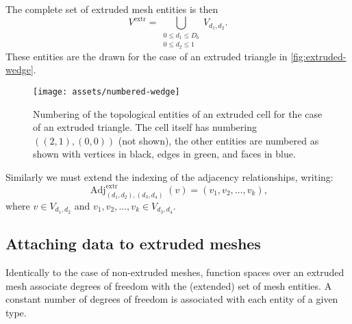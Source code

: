 \documentclass[11pt, a4paper]{scrartcl}
\DeclareMathOperator{\Adj}{Adj}
\begin{document}
The complete set of extruded mesh entities is then
\begin{equation}
V^\textrm{extr} =\bigcup\limits_{\substack{ 0 \leq d_{1} \leq D_{b} \\ 0 \leq d_{2} \leq 1}} V_{d_{1}, d_{2}}.
\end{equation}
These entities are the drawn for the case of an extruded triangle in
\autoref{fig:extruded-wedge}.
\begin{figure}[htbp]
  \centering
  \texttt{[image: assets/numbered-wedge]}
  \caption{Numbering of the topological entities of an extruded cell
    for the case of an extruded triangle.  The cell itself has
    numbering $((2, 1), (0, 0))$ (not shown), the other entities are
    numbered as shown with vertices in black, edges in green, and faces
    in blue.}
  \label{fig:extruded-wedge}
\end{figure}

Similarly we must extend the indexing of the adjacency relationships,
writing:
\begin{equation}
 \Adj^\textrm{extr}_{(d_{1}, d_{2}), (d_{3}, d_{4})}(v) = (v_{1}, v_{2}, \dots, v_{k}),
\end{equation}
where $v \in V_{d_{1}, d_{2}}$ and
$v_{1}, v_{2}, \dots, v_{k} \in V_{d_{3}, d_{4}}$.

\subsection{Attaching data to extruded meshes}
\label{ssec:ext-mesh-data}

Identically to the case of non-extruded meshes, function spaces over
an extruded mesh associate degrees of freedom with the (extended) set
of mesh entities. A constant number of degrees of freedom is
associated with each entity of a given type.
\end{document}
